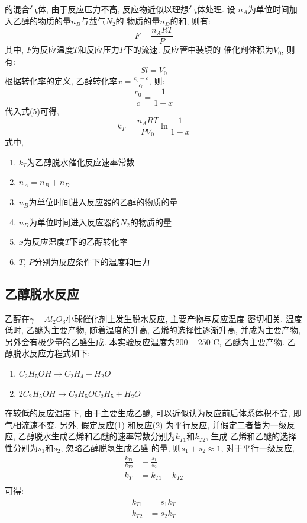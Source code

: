 \documentclass[a4paper]{article}
\begin{document}
的混合气体, 由于反应压力不高, 反应物近似以理想气体处理. 设
$n_{A}$为单位时间加入乙醇的物质的量$n_{B}$与载气$N_{2}$的
物质的量$n_{D}$的和, 则有:
\begin{equation}
F = \frac{n_{A}RT}{P}
\end{equation}
其中, $F$为反应温度$T$和反应压力$P$下的流速. 反应管中装填的
催化剂体积为$V_{0}$, 则有:
\begin{equation}
Sl = V_{0}
\end{equation}
根据转化率的定义, 乙醇转化率$x = \frac{c_{0}-c}{c_{0}}$, 则:
\begin{equation}
\frac{c_{0}}{c} = \frac{1}{1-x}
\end{equation}
代入式(5)可得, 
\begin{equation}
k_{T} = \frac{n_{A}RT}{PV_{0}}\ln\frac{1}{1-x}
\end{equation}
式中, 
\begin{enumerate}
	\item[] $k_{T}$为乙醇脱水催化反应速率常数
	\item[] $n_{A} = n_{B} + n_{D}$
	\item[] $n_{B}$为单位时间进入反应器的乙醇的物质的量
	\item[] $n_{D}$为单位时间进入反应器的$N_{2}$的物质的量
	\item[] $x$为反应温度$T$下的乙醇转化率
	\item[] $T$, $P$分别为反应条件下的温度和压力
\end{enumerate}
\subsection{乙醇脱水反应}
乙醇在$\gamma-Al_2O_3$小球催化剂上发生脱水反应, 主要产物与反应温度
密切相关. 温度低时, 乙醚为主要产物, 随着温度的升高, 
乙烯的选择性逐渐升高, 并成为主要产物, 另外会有极少量的乙醛生成. 
本实验反应温度为$200-250^\circ$C, 乙醚为主要产物. 
乙醇脱水反应方程式如下: 
\begin{enumerate}
	\item $C_{2}H_{5}OH \to C_{2}H_{4} + H_{2}O$
	\item $2C_{2}H_{5}OH \to C_{2}H_{5}OC_{2}H_{5} + H_{2}O$
\end{enumerate}
\par
在较低的反应温度下, 由于主要生成乙醚, 
可以近似认为反应前后体系体积不变, 即气相流速不变. 
另外, 假定反应(1) 和反应(2) 为平行反应, 并假定二者皆为一级反应, 
乙醇脱水生成乙烯和乙醚的速率常数分别为$k_{T1}$和$k_{T2}$, 生成
乙烯和乙醚的选择性分别为$s_{1}$和$s_{2}$, 忽略乙醇脱氢生成乙醛
的量, 则$s_{1}+s_{2}\approx 1$, 对于平行一级反应,
\begin{equation}
	\begin{aligned}
		\frac{k_{T1}}{k_{T2}} &= \frac{s_{1}}{s_{2}}\\
		k_{T} &= k_{T1} + k_{T2}\\
	\end{aligned}
\end{equation}
可得:
\begin{equation}
	\begin{aligned}
		k_{T1} &= s_{1}k_{T}\\
		k_{T2} &= s_{2}k_{T}\\
	\end{aligned}
\end{equation}
\end{document}
